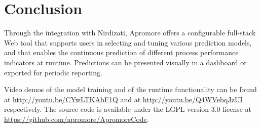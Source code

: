 \documentclass[runningheads,a4paper]{llncs}
\begin{document}
\section{Conclusion} \label{sec:conclusion}
Through the integration with Nirdizati, Apromore offers a configurable full-stack Web tool that supports users in selecting and tuning various prediction models, and that enables the continuous prediction of different process performance indicators at runtime. Predictions can be presented visually in a dashboard or exported for periodic reporting.

Video demos of the model training and of the runtime functionality can be found at \url{http://youtu.be/CYwLTKAbF1Q} and at \url{http://youtu.be/Q4WVebqJzUI} respectively. The source code is available under the LGPL version 3.0 license at \url{https://github.com/apromore/ApromoreCode}.


\end{document}
